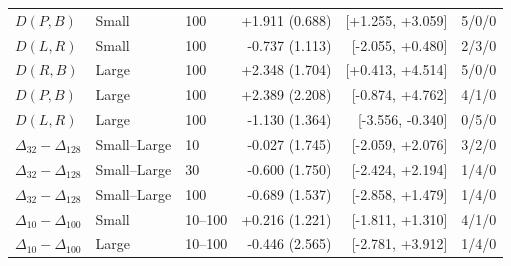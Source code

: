 \begin{longtable}{lllrrr}
$D(P,B)$ & Small & 100 & +1.911 (0.688) & [+1.255, +3.059] & 5/0/0\\
$D(L,R)$ & Small & 100 & -0.737 (1.113) & [-2.055, +0.480] & 2/3/0\\
\midrule
$D(R,B)$ & Large & 100 & +2.348 (1.704) & [+0.413, +4.514] & 5/0/0\\
$D(P,B)$ & Large & 100 & +2.389 (2.208) & [-0.874, +4.762] & 4/1/0\\
$D(L,R)$ & Large & 100 & -1.130 (1.364) & [-3.556, -0.340] & 0/5/0\\
\midrule
$\Delta_{32}-\Delta_{128}$ & Small--Large & 10 & -0.027 (1.745) & [-2.059, +2.076] & 3/2/0\\
$\Delta_{32}-\Delta_{128}$ & Small--Large & 30 & -0.600 (1.750) & [-2.424, +2.194] & 1/4/0\\
$\Delta_{32}-\Delta_{128}$ & Small--Large & 100 & -0.689 (1.537) & [-2.858, +1.479] & 1/4/0\\
\midrule
$\Delta_{10}-\Delta_{100}$ & Small & 10--100 & +0.216 (1.221) & [-1.811, +1.310] & 4/1/0\\
$\Delta_{10}-\Delta_{100}$ & Large & 10--100 & -0.446 (2.565) & [-2.781, +3.912] & 1/4/0\\
\bottomrule
\end{longtable}
\endgroup
